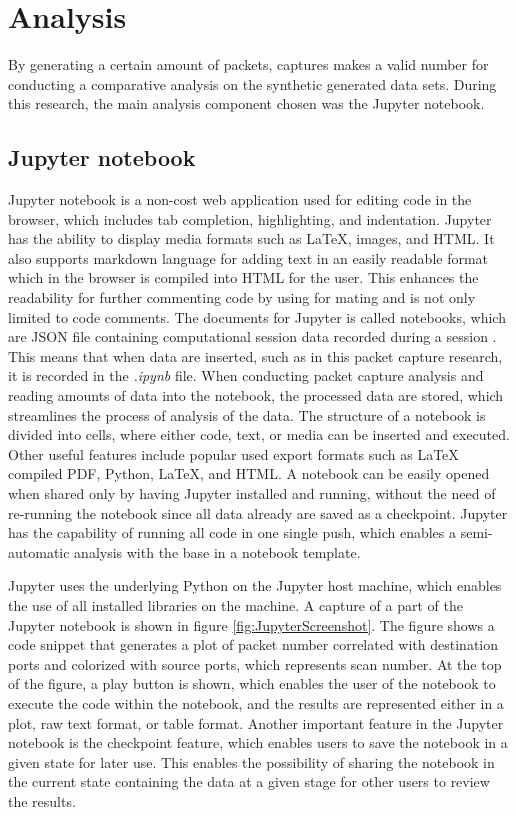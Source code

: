 \section{Analysis}
\label{s:DataGAAnalysis}

By generating a certain amount of packets, captures makes a valid number for conducting a comparative analysis on the synthetic generated data sets.
During this research, the main analysis component chosen was the Jupyter notebook.

\subsection{Jupyter notebook}
\label{s:AnalysisJupyter}
Jupyter notebook is a non-cost web application used for editing code in the browser, which includes tab completion, highlighting, and indentation. Jupyter has the ability to display media formats such as LaTeX, images, and HTML. It also supports markdown language for adding text in an easily readable format which in the browser is compiled into HTML for the user. This enhances the readability for further commenting code by using for mating and is not only limited to code comments.
The documents for Jupyter is called notebooks, which are JSON file containing computational session data recorded during a session \autocite{electronics10151849, jupyter}.
This means that when data are inserted, such as in this packet capture research, it is recorded in the \textit{.ipynb} file. When conducting packet capture analysis and reading amounts of data into the notebook, the processed data are stored, which streamlines the process of analysis of the data.
The structure of a notebook is divided into cells, where either code, text, or media can be inserted and executed.
Other useful features include popular used export formats such as LaTeX compiled PDF, Python, LaTeX, and HTML.
A notebook can be easily opened when shared only by having Jupyter installed and running, without the need of re-running the notebook since all data already are saved as a checkpoint.
Jupyter has the capability of running all code in one single push, which enables a semi-automatic analysis with the base in a notebook template.

Jupyter uses the underlying Python on the Jupyter host machine, which enables the use of all installed libraries on the machine.
A capture of a part of the Jupyter notebook is shown in figure \ref{fig:JupyterScreenshot}.
The figure shows a code snippet that generates a plot of packet number correlated with destination ports and colorized with source ports, which represents scan number.
At the top of the figure, a play button is shown, which enables the user of the notebook to execute the code within the notebook, and the results are represented either in a plot, raw text format, or table format.
Another important feature in the Jupyter notebook is the checkpoint feature, which enables users to save the notebook in a given state for later use. This enables the possibility of sharing the notebook in the current state containing the data at a given stage for other users to review the results.


